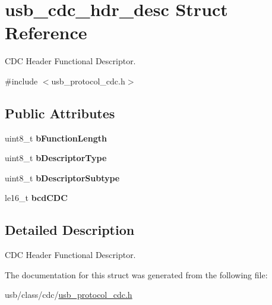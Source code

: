 \hypertarget{structusb__cdc__hdr__desc}{}\section{usb\+\_\+cdc\+\_\+hdr\+\_\+desc Struct Reference}
\label{structusb__cdc__hdr__desc}


C\+DC Header Functional Descriptor.  




{\ttfamily \#include $<$usb\+\_\+protocol\+\_\+cdc.\+h$>$}

\subsection*{Public Attributes}
\begin{DoxyCompactItemize}
\item 
\mbox{\label{structusb__cdc__hdr__desc_a7493647cf2bdade9dc92bfc4310ee53a}} 
uint8\+\_\+t {\bfseries b\+Function\+Length}
\item 
\mbox{\label{structusb__cdc__hdr__desc_a20060c88108eae0c34628a5fd8b7fa06}} 
uint8\+\_\+t {\bfseries b\+Descriptor\+Type}
\item 
\mbox{\label{structusb__cdc__hdr__desc_af551db6e8054f1e1cc5c8d6c8d009a14}} 
uint8\+\_\+t {\bfseries b\+Descriptor\+Subtype}
\item 
\mbox{\label{structusb__cdc__hdr__desc_a3d3f9746660f6926b6695bc73d31b908}} 
le16\+\_\+t {\bfseries bcd\+C\+DC}
\end{DoxyCompactItemize}


\subsection{Detailed Description}
C\+DC Header Functional Descriptor. 

The documentation for this struct was generated from the following file\+:\begin{DoxyCompactItemize}
\item 
usb/class/cdc/\hyperlink{usb__protocol__cdc_8h}{usb\+\_\+protocol\+\_\+cdc.\+h}\end{DoxyCompactItemize}
